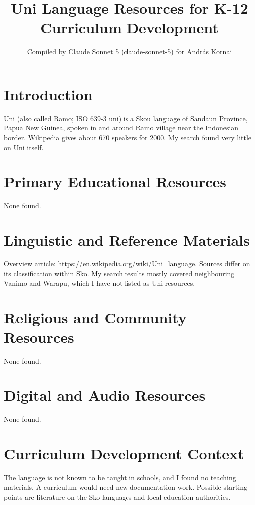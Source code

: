 \documentclass[12pt]{article}
\title{Uni Language Resources for K-12 Curriculum Development}
\author{Compiled by Claude Sonnet 5 (claude-sonnet-5) for Andr\'as Kornai}
\date{}
\begin{document}
\maketitle
\section{Introduction}
Uni (also called Ramo; ISO 639-3 uni) is a Skou language of Sandaun Province, Papua New Guinea, spoken in and around Ramo village near the Indonesian border. Wikipedia gives about 670 speakers for 2000. My search found very little on Uni itself.
\section{Primary Educational Resources}
None found.
\section{Linguistic and Reference Materials}
Overview article: \url{https://en.wikipedia.org/wiki/Uni_language}. Sources differ on its classification within Sko. My search results mostly covered neighbouring Vanimo and Warapu, which I have not listed as Uni resources.
\section{Religious and Community Resources}
None found.
\section{Digital and Audio Resources}
None found.
\section{Curriculum Development Context}
The language is not known to be taught in schools, and I found no teaching materials. A curriculum would need new documentation work. Possible starting points are literature on the Sko languages and local education authorities.
\end{document}
